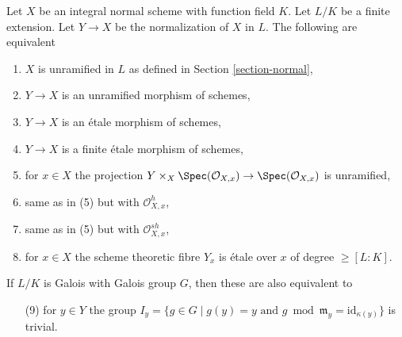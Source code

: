 \begin{lemma}
\label{lemma-unramified}
Let $X$ be an integral normal scheme with function field $K$.
Let $L/K$ be a finite extension. Let $Y \to X$ be the normalization
of $X$ in $L$. The following are equivalent
\begin{enumerate}
\item $X$ is unramified in $L$ as defined in Section \ref{section-normal},
\item $Y \to X$ is an unramified morphism of schemes,
\item $Y \to X$ is an \'etale morphism of schemes,
\item $Y \to X$ is a finite \'etale morphism of schemes,
\item for $x \in X$ the projection
$Y \times_X \Spec(\mathcal{O}_{X, x}) \to \Spec(\mathcal{O}_{X, x})$
is unramified,
\item same as in (5) but with $\mathcal{O}_{X, x}^h$,
\item same as in (5) but with $\mathcal{O}_{X, x}^{sh}$,
\item for $x \in X$ the scheme theoretic fibre $Y_x$
is \'etale over $x$ of degree $\geq [L : K]$.
\end{enumerate}
If $L/K$ is Galois with Galois group $G$, then these are also
equivalent to
\begin{enumerate}
\item[(9)] for $y \in Y$ the group
$I_y = \{g \in G \mid g(y) = y\text{ and }
g \bmod \mathfrak m_y = \text{id}_{\kappa(y)}\}$ is trivial.
\end{enumerate}
\end{lemma}

